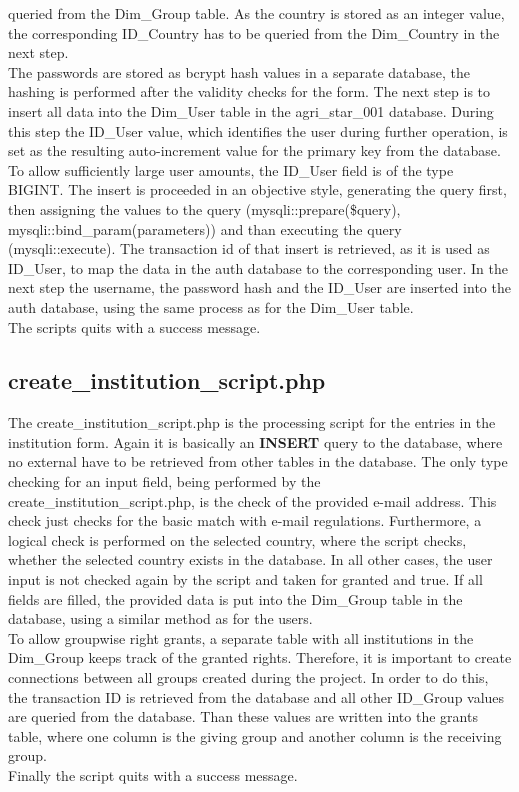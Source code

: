 queried from the Dim\_Group table. As the country is stored as an integer value, the corresponding ID\_Country has to be queried from the Dim\_Country in the next step.\\
The passwords are stored as bcrypt hash values in a separate database, the hashing is performed after the validity checks for the form. The next step is to insert all data into the 
Dim\_User table in the agri\_star\_001 database. During this step the ID\_User value, which identifies the user during further operation, is set as the resulting auto-increment 
value for the primary key from the database. To allow sufficiently large user amounts, the ID\_User field is of the type BIGINT. The insert is proceeded in an objective style, 
generating the query first, then assigning the values to the query (mysqli::prepare(\$query), mysqli::bind\_param(parameters)) and than executing the query (mysqli::execute). 
The transaction id of that insert is retrieved, as it is used as ID\_User, to map the data in the auth database to the corresponding user. 
In the next step the username, the password hash and the ID\_User are inserted into the auth database, using the same process as for the Dim\_User table.\\
The scripts quits with a success message.

\label{create_institution_script.php}
\subsection{create\_institution\_script.php}
The create\_institution\_script.php is the processing script for the entries in the institution form. Again it is basically an \textbf{INSERT} query to the database, where no 
external have to be retrieved from other tables in the database. The only type checking for an input field, being performed by the create\_institution\_script.php, is the check 
of the provided e-mail address. This check just checks for the basic match with e-mail regulations. Furthermore, a logical check is performed on the selected country, where the 
script checks, whether the selected country exists in the database. In all other cases, the user input is not checked again by the script and taken for granted and true. 
If all fields are filled, the provided data is put into the Dim\_Group table in the database, using a similar method as for the users.\\
To allow groupwise right grants, a separate table with all institutions in the Dim\_Group keeps track of the granted rights. Therefore, it is important to create connections between 
all groups created during the project. In order to do this, the transaction ID is retrieved from the database and all other ID\_Group values are queried from the database. Than 
these values are written into the grants table, where one column is the giving group and another column is the receiving group. \\
Finally the script quits with a success message.

